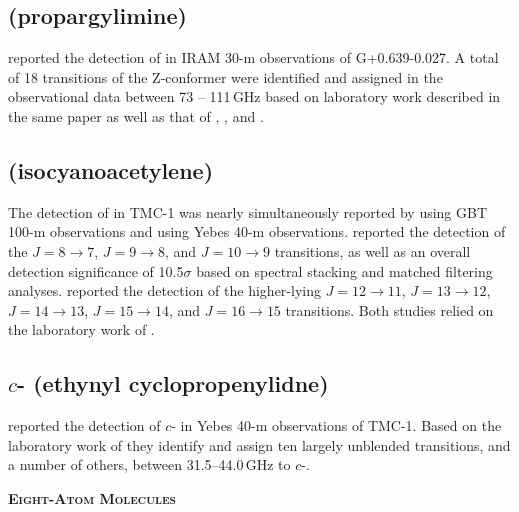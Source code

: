 \documentclass[twocolumn]{aastex631}
\newcommand{\update}[1]{{#1}}
\begin{document}
	\subsection{\update{ (propargylimine)}}
	\label{HC3HNH}
	
	\update{\citet{2020A&A...640A..98B} reported the detection of \ce{HC3HNH} in IRAM 30-m observations of G+0.639-0.027.  A total of 18 transitions of the Z-conformer were identified and assigned in the observational data between 73 -- 111\,GHz based on laboratory work described in the same paper as well as that of \citet{Kroto:1984hu}, \citet{1985JMoSp.111...83S}, and \citet{1988JMoSt.190..195M}.}	
	
	\subsection{\update{ (isocyanoacetylene)}}
	\label{HC4NC}
	
	\update{The detection of  in TMC-1 was nearly simultaneously reported by \cite{Xue:2020aa} using GBT 100-m observations and \citet{Cernicharo:2020cf} using Yebes 40-m observations.  \citet{Xue:2020aa} reported the detection of the $J = 8\rightarrow7$, $J = 9\rightarrow8$, and $J = 10\rightarrow9$ transitions, as well as an overall detection significance of 10.5$\sigma$ based on spectral stacking and matched filtering analyses.  \citet{Cernicharo:2020cf} reported the detection of the higher-lying $J = 12\rightarrow11$, $J = 13\rightarrow12$, $J = 14\rightarrow13$, $J = 15\rightarrow14$, and $J = 16\rightarrow15$ transitions.  Both studies relied on the laboratory work of \citet{Botschwina:1998dg}.}
	
	\subsection{\update{$c$- (ethynyl cyclopropenylidne)}}
	\label{C3HCCH}
	
	\update{\citet{2021A&A...649L..15C} reported the detection of $c$-\ce{C3HCCH} in Yebes 40-m observations of TMC-1.  Based on the laboratory work of \citet{1997ApJ...483L.135T} they identify and assign ten largely unblended transitions, and a number of others, between 31.5--44.0\,GHz to $c$-\ce{C3HCCH}.}
	
    
    \begin{center}
        \large
        \textsc{\textbf{Eight-Atom Molecules}}
        \label{8atoms}
        \normalsize
    \end{center}      
    
\end{document}
